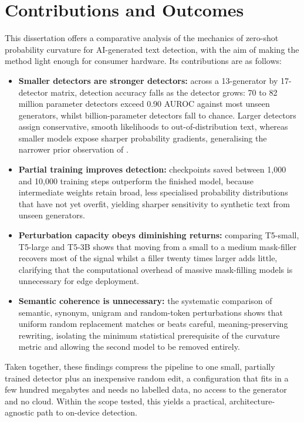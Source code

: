 \documentclass[logo,msc,cs]{infthesis}      %
\begin{document}
\section{Contributions and Outcomes}
\label{sec:contributions}
This dissertation offers a comparative analysis of the mechanics of zero-shot probability curvature for AI-generated text detection, with the aim of making the method light enough for consumer hardware. Its contributions are as follows:
\begin{itemize}
\item \textbf{Smaller detectors are stronger detectors:} across a 13-generator by 17-detector matrix, detection accuracy falls as the detector grows: 70 to 82 million parameter detectors exceed 0.90 AUROC against most unseen generators, whilst billion-parameter detectors fall to chance. Larger detectors assign conservative, smooth likelihoods to out-of-distribution text, whereas smaller models expose sharper probability gradients, generalising the narrower prior observation of \citet{mireshghallah2023smaller}.
\item \textbf{Partial training improves detection:} checkpoints saved between 1,000 and 10,000 training steps outperform the finished model, because intermediate weights retain broad, less specialised probability distributions that have not yet overfit, yielding sharper sensitivity to synthetic text from unseen generators.
\item \textbf{Perturbation capacity obeys diminishing returns:} comparing T5-small, T5-large and T5-3B shows that moving from a small to a medium mask-filler recovers most of the signal whilst a filler twenty times larger adds little, clarifying that the computational overhead of massive mask-filling models is unnecessary for edge deployment.
\item \textbf{Semantic coherence is unnecessary:} the systematic comparison of semantic, synonym, unigram and random-token perturbations shows that uniform random replacement matches or beats careful, meaning-preserving rewriting, isolating the minimum statistical prerequisite of the curvature metric and allowing the second model to be removed entirely.
\end{itemize}
Taken together, these findings compress the pipeline to one small, partially trained detector plus an inexpensive random edit, a configuration that fits in a few hundred megabytes and needs no labelled data, no access to the generator and no cloud. Within the scope tested, this yields a practical, architecture-agnostic path to on-device detection.
\end{document}
